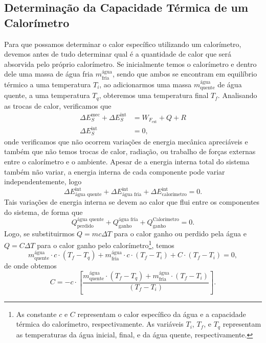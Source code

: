 \subsection{Determinação da Capacidade Térmica de um Calorímetro}

Para que possamos determinar o calor específico utilizando um calorímetro, devemos antes de tudo determinar qual é a quantidade de calor que será absorvida pelo próprio calorímetro. Se inicialmente temos o calorímetro e dentro dele uma massa de água fria $m_{\text{fria}}^{\text{água}}$, sendo que ambos se encontram em equilíbrio térmico a uma temperatura $T_i$, ao adicionarmos uma massa $m_{\text{quente}}^{\text{água}}$ de água quente, a uma temperatura $T_q$, obteremos uma temperatura final $T_f$. Analisando as trocas de calor, verificamos que
\begin{align}
    \Delta E_S^{\text{mec}} + \Delta E_S^{\text{int}} &= W_{F_{\text{ext}}} + Q + R \\
    \Delta E_S^{\text{int}} &= 0,
\end{align}
%
onde verificamos que não ocorrem variações de energia mecânica apreciáveis e também que não temos trocas de calor, radiação, ou trabalho de forças externas entre o calorímetro e o ambiente. Apesar de a energia interna total do sistema também não variar, a energia interna de cada componente pode variar independentemente, logo
\begin{equation}
    \Delta E_{\text{água quente}}^{\text{int}} + \Delta E_{\text{água fria}}^{\text{int}} + \Delta E_{\text{calorímetro}}^{\text{int}} = 0.
\end{equation}
%
Tais variações de energia interna se devem ao calor que flui entre os componentes do sistema, de forma que
\begin{equation}
	Q^{\text{água quente}}_{\text{perdido}} + Q^{\text{água fria}}_{\text{ganho}} + Q^{\text{Calorímetro}}_{\text{ganho}} = 0.
\end{equation}
%
Logo, se substituirmos $Q = mc\Delta T$ para o calor ganho ou perdido pela água e $Q = C\Delta T$ para o calor ganho pelo calorímetro\footnote{As constante $c$ e $C$ representam o calor específico da água e a capacidade térmica do calorímetro, respectivamente. As variáveis $T_i$, $T_f$, e $T_q$ representam as temperaturas da água inicial, final, e da água quente, respectivamente.}, temos
\begin{equation}
	m_{\text{quente}}^{\text{água}}\cdot c \cdot (T_f - T_q) + m_{\text{fria}}^{\text{água}} \cdot c \cdot (T_f - T_i) + C \cdot (T_f - T_i) = 0,
\end{equation}
%
de onde obtemos
\begin{equation}
	C = -c\cdot\left[\frac{m_{\text{quente}}^{\text{água}} \cdot (T_f - T_q)+m_{\text{fria}}^{\text{água}} \cdot (T_f - T_i)}{(T_f - T_i)}\right].
\end{equation}

